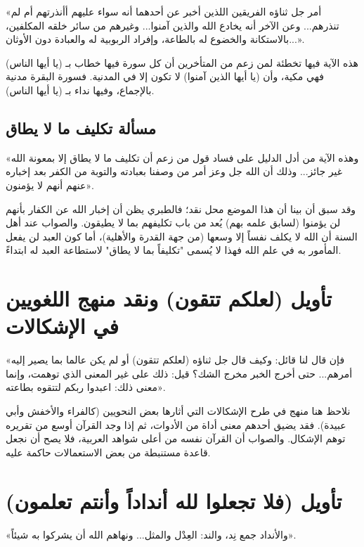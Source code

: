 «أمر جل ثناؤه الفريقين اللذين أخبر عن أحدهما أنه سواء عليهم أأنذرتهم أم لم تنذرهم... وعن الآخر أنه يخادع الله والذين آمنوا... وغيرهم من سائر خلقه المكلفين، بالاستكانة والخضوع له بالطاعة، وإفراد الربوبية له والعبادة دون الأوثان...».

\begin{fawaid}
هذه الآية فيها تخطئة لمن زعم من المتأخرين أن كل سورة فيها خطاب بـ (يا أيها الناس) فهي مكية، وأن (يا أيها الذين آمنوا) لا تكون إلا في المدنية. فسورة البقرة مدنية بالإجماع، وفيها نداء بـ (يا أيها الناس).
\end{fawaid}

\subsection{مسألة تكليف ما لا يطاق}
 «وهذه الآية من أدل الدليل على فساد قول من زعم أن تكليف ما لا يطاق إلا بمعونة الله غير جائز... وذلك أن الله جل وعز أمر من وصفنا بعبادته والتوبة من الكفر بعد إخباره عنهم أنهم لا يؤمنون».

وقد سبق أن بينا أن هذا الموضع محل نقد؛ فالطبري يظن أن إخبار الله عن الكفار بأنهم لن يؤمنوا (لسابق علمه بهم) يُعد من باب تكليفهم بما لا يطيقون. والصواب عند أهل السنة أن الله لا يكلف نفساً إلا وسعها (من جهة القدرة والأهلية)، أما كون العبد لن يفعل المأمور به في علم الله فهذا لا يُسمى "تكليفاً بما لا يطاق" لاستطاعة العبد له ابتداءً.

\separator

\section{تأويل (لعلكم تتقون) ونقد منهج اللغويين في الإشكالات}
 «فإن قال لنا قائل: وكيف قال جل ثناؤه (لعلكم تتقون) أو لم يكن عالما بما يصير إليه أمرهم... حتى أخرج الخبر مخرج الشك؟ قيل: ذلك على غير المعنى الذي توهمت، وإنما معنى ذلك: اعبدوا ربكم لتتقوه بطاعته».

\begin{fawaid}
نلاحظ هنا منهج  في طرح الإشكالات التي أثارها بعض النحويين (كالفراء والأخفش وأبي عبيدة). فقد يضيق أحدهم معنى أداة من الأدوات، ثم إذا وجد القرآن أوسع من تقريره توهم الإشكال. والصواب أن القرآن نفسه من أعلى شواهد العربية، فلا يصح أن نجعل قاعدة مستنبطة من بعض الاستعمالات حاكمة عليه.
\end{fawaid}

\separator

\section{تأويل (فلا تجعلوا لله أنداداً وأنتم تعلمون)}
 «والأنداد جمع نِد، والند: العِدْل والمثل... ونهاهم الله أن يشركوا به شيئاً».

